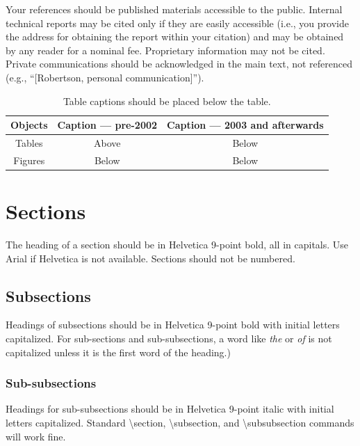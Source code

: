 \documentclass{sigchi}
\newcommand\tabhead[1]{\small\textbf{#1}}
\begin{document}
Your references should be published materials accessible to the
public. Internal technical reports may be cited only if they are
easily accessible (i.e., you provide the address for obtaining the
report within your citation) and may be obtained by any reader for a
nominal fee. Proprietary information may not be cited. Private
communications should be acknowledged in the main text, not referenced
(e.g., ``[Robertson, personal communication]'').

\begin{table}
\centering
\begin{tabular}{|c|c|c|}
\hline
\tabhead{Objects} &
\multicolumn{1}{|p{0.3\columnwidth}|}{\centering\tabhead{Caption --- pre-2002}} &
\multicolumn{1}{|p{0.4\columnwidth}|}{\centering\tabhead{Caption --- 2003 and afterwards}} \\
\hline
Tables & Above & Below \\
\hline
Figures & Below & Below \\
\hline
\end{tabular}
\caption{Table captions should be placed below the table.}
\label{tab:table1}
\end{table}

\section{Sections}

The heading of a section should be in Helvetica 9-point bold, all in
capitals. Use Arial if Helvetica is not available. Sections should
not be numbered.

\subsection{Subsections}

Headings of subsections should be in Helvetica 9-point bold with
initial letters capitalized. For
sub-sections and sub-subsections, a word like \emph{the} or \emph{of}
is not capitalized unless it is the first word of the heading.)

\subsubsection{Sub-subsections}

Headings for sub-subsections should be in Helvetica 9-point italic
with initial letters capitalized. Standard {\textbackslash}section,
{\textbackslash}subsection, and {\textbackslash}subsubsection commands
will work fine.
\end{document}
